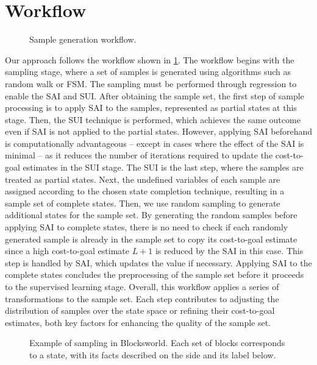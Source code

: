 \section{Workflow}
\label{sec:workflow}

\begin{figure}[tb]
    \caption{Sample generation workflow.}
    \label{fig:workflow}
    \addmargin
    \centering
    
\end{figure}

Our approach follows the workflow shown in \cref{fig:workflow}.
The workflow begins with the sampling stage, where a set of samples is generated using algorithms such as random walk or FSM. The sampling must be performed through regression to enable the SAI and SUI.
After obtaining the sample set, the first step of sample processing is to apply SAI to the samples, represented as partial states at this stage. Then, the SUI technique is performed, which achieves the same outcome even if SAI is not applied to the partial states. However, applying SAI beforehand is computationally advantageous -- except in cases where the effect of the SAI is minimal -- as it reduces the number of iterations required to update the cost-to-goal estimates in the SUI stage.
The SUI is the last step, where the samples are treated as partial states. Next, the undefined variables of each sample are assigned according to the chosen state completion technique, resulting in a sample set of complete states.
Then, we use random sampling to generate additional states for the sample set. By generating the random samples before applying SAI to complete states, there is no need to check if each randomly generated sample is already in the sample set to copy its cost-to-goal estimate since a high cost-to-goal estimate $L+1$ is reduced by the SAI in this case. This step is handled by SAI, which updates the value if necessary. Applying SAI to the complete states concludes the preprocessing of the sample set before it proceeds to the supervised learning stage.
Overall, this workflow applies a series of transformations to the sample set. Each step contributes to adjusting the distribution of samples over the state space or refining their cost-to-goal estimates, both key factors for enhancing the quality of the sample set.

\begin{figure}[tb]
    \caption[Example of sampling in Blocksworld.]{Example of sampling in Blocksworld. Each set of blocks corresponds to a state, with its facts described on the side and its label below.}
    \label{fig:example}
    \addmargin
    \centering
    
\end{figure}

